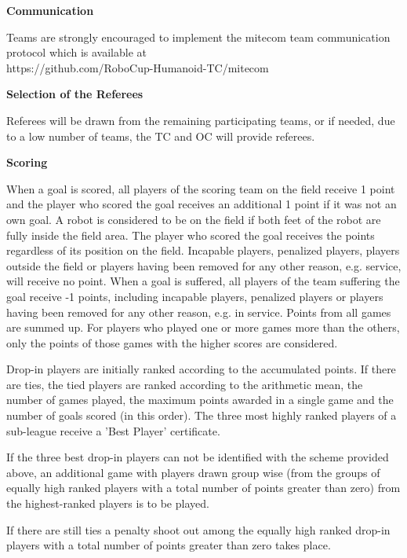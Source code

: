 \bigskip
 
{\bfseries Communication}

Teams are strongly encouraged to implement the mitecom team communication protocol which is available at \\
\textcolor[rgb]{0.0,0.0,0.49803922}{https://github.com/RoboCup-Humanoid-TC/mitecom}

\bigskip
 
{\bfseries Selection of the Referees}

Referees will be drawn from the remaining participating teams, or if needed, due to a low number of teams, the TC and OC will provide referees. 

\bigskip
 
{\bfseries Scoring}

When a goal is scored, all players of the scoring team on the field receive 1 point and the player who scored the goal receives an additional 1 point if it was not an own goal. A robot is considered to be on the field if both feet of the robot are fully inside the field area. The player who scored the goal receives the points regardless of its position on the field. Incapable players, penalized players, players outside the field or players having been removed for any other reason, e.g. service, will receive no point. When a goal is suffered, all players of the team suffering the goal receive -1 points, including incapable players, penalized players or players having been removed for any other reason, e.g. in service. Points from all games are summed up. For players who played one or more games more than the others, only the points of those games with the higher scores are considered.

Drop-in players are initially ranked according to the accumulated points. If there are ties, the tied players are ranked according to the arithmetic mean, the number of games played, the maximum points awarded in a single game and the number of goals scored (in this order). The three most highly ranked players of a sub-league receive a 'Best Player' certificate.

If the three best drop-in players can not be identified with the scheme provided above, an additional game with players drawn group wise (from the groups of equally high ranked players with a total number of points greater than zero) from the highest-ranked players is to be played.

If there are still ties a penalty shoot out among the equally high ranked drop-in players with a total number of points greater than zero takes place.

